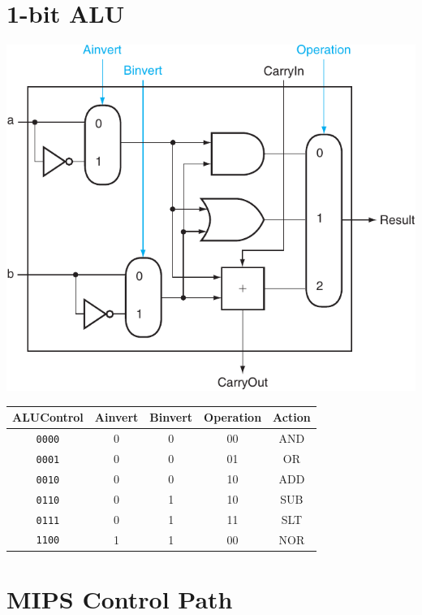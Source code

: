 \documentclass[10pt]{article}
\begin{document}
\begin{minipage}[t]{0.35\linewidth}
    \section*{1-bit ALU}
    \includegraphics[width=\linewidth]{content/alu.pdf}
    \begin{center}
        \begin{tabular}[t]{c|ccc|c}
            \toprule
            ALUControl & Ainvert & Binvert & Operation & Action \\
            \midrule
            {\tt 0000} & 0       & 0       & 00        & AND    \\
            {\tt 0001} & 0       & 0       & 01        & OR     \\
            {\tt 0010} & 0       & 0       & 10        & ADD    \\
            {\tt 0110} & 0       & 1       & 10        & SUB    \\
            {\tt 0111} & 0       & 1       & 11        & SLT    \\
            {\tt 1100} & 1       & 1       & 00        & NOR    \\
            \bottomrule
        \end{tabular}
    \end{center}
\end{minipage}

\begin{minipage}[t]{\linewidth}
    \section*{MIPS Control Path}

    \begin{minipage}[t]{0.32\textwidth}
        
    \end{minipage}
    \begin{minipage}[t]{0.64\textwidth}
        
    \end{minipage}
\end{minipage}
\end{document}
